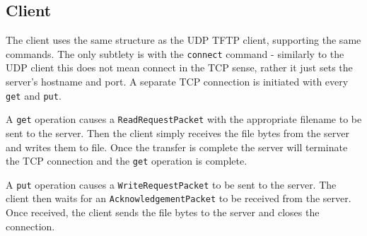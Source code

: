\documentclass[a4paper]{article}
\newcommand{\code}{\texttt}
\begin{document}
\subsection{Client}

The client uses the same structure as the UDP TFTP client, supporting the same commands. The only subtlety is with the \code{connect} command - similarly to the UDP client this does not mean connect in the TCP sense, rather it just sets the server's hostname and port. A separate TCP connection is initiated with every \code{get} and \code{put}.

A \code{get} operation causes a \code{ReadRequestPacket} with the appropriate filename to be sent to the server. Then the client simply receives the file bytes from the server and writes them to file. Once the transfer is complete the server will terminate the TCP connection and the \code{get} operation is complete.

A \code{put} operation causes a \code{WriteRequestPacket} to be sent to the server. The client then waits for an \code{AcknowledgementPacket} to be received from the server. Once received, the client sends the file bytes to the server and closes the connection. 
\end{document}
